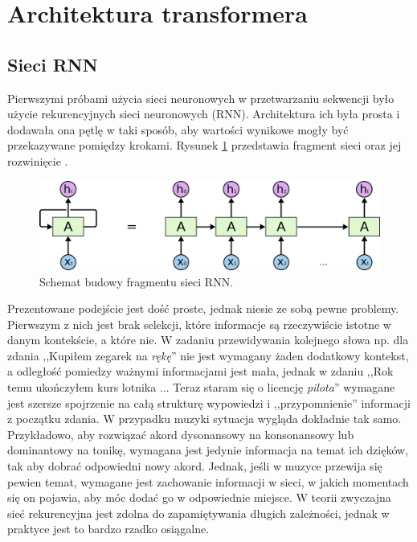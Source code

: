 \documentclass[data-science]{agh-wi} %
\begin{document}
\section{Architektura transformera}
\subsection{Sieci RNN}
Pierwszymi próbami użycia sieci neuronowych w przetwarzaniu sekwencji było użycie rekurencyjnych sieci neuronowych (RNN). Architektura ich była prosta i dodawała ona pętlę w taki sposób, aby wartości wynikowe mogły być przekazywane pomiędzy krokami. Rysunek \ref*{fig:rnn_scheme} przedstawia fragment sieci oraz jej rozwinięcie \cite{Understanding_lstm}.
\begin{figure}[ht!]
    \begin{center}
        \includegraphics[width=0.7\linewidth]{./img/rnn_scheme.png}
    \end{center}
    \caption{Schemat budowy fragmentu sieci RNN.}\label{fig:rnn_scheme}
\end{figure}

Prezentowane podejście jest dość proste, jednak niesie ze sobą pewne problemy. Pierwszym z nich jest brak selekcji, które informacje są rzeczywiście istotne w danym kontekście, a które nie. W zadaniu przewidywania kolejnego słowa np. dla zdania ,,Kupiłem zegarek na \textit{rękę}'' nie jest wymagany żaden dodatkowy kontekst, a odległość pomiedzy ważnymi informacjami jest mała, jednak w zdaniu ,,Rok temu ukończyłem kurs lotnika ... Teraz staram się o licencję \textit{pilota}'' wymagane jest szersze spojrzenie na całą strukturę wypowiedzi i ,,przypomnienie'' informacji z początku zdania. W przypadku muzyki sytuacja wygląda dokładnie tak samo. Przykładowo, aby rozwiązać akord dysonansowy na konsonansowy lub dominantowy na tonikę, wymagana jest jedynie informacja na temat ich dzięków, tak aby dobrać odpowiedni nowy akord. Jednak, jeśli w muzyce przewija się pewien temat, wymagane jest zachowanie informacji w sieci, w jakich momentach się on pojawia, aby móc dodać go w odpowiednie miejsce. W teorii zwyczajna sieć rekurencyjna jest zdolna do zapamiętywania długich zależności, jednak w praktyce jest to bardzo rzadko osiągalne.
\end{document}
